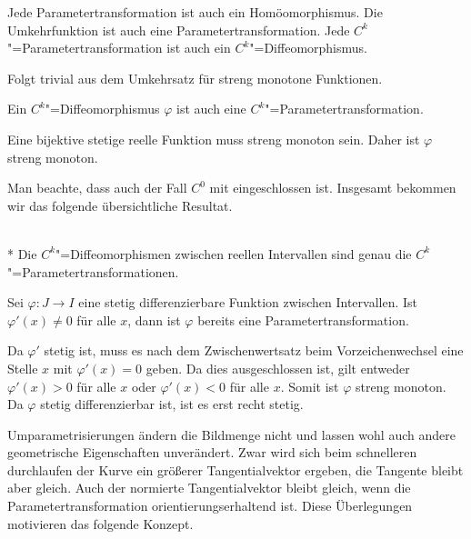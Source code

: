 \begin{corollary}
Jede Parametertransformation ist auch ein
Homöomorphismus. Die Umkehrfunktion ist auch eine
Parametertransformation. Jede $C^k$"=Parametertransformation
ist auch ein $C^k$"=Diffeomorphismus.
\end{corollary}

\noindent{}
Folgt trivial aus dem Umkehrsatz für streng monotone
Funktionen.\;\qedsymbol

\begin{corollary}
Ein $C^k$"=Diffeomorphismus $\varphi$ ist auch eine
$C^k$"=Parametertransformation.
\end{corollary}

\noindent{}
Eine bijektive stetige reelle Funktion muss streng monoton sein.
Daher ist $\varphi$ streng monoton.\;\qedsymbol

Man beachte, dass auch der Fall $C^0$ mit eingeschlossen ist.
Insgesamt bekommen wir das folgende übersichtliche Resultat.

\begin{corollary}\mbox{}\\*
Die $C^k$"=Diffeomorphismen zwischen reellen Intervallen sind
genau die $C^k$"=Parametertransformationen.
\end{corollary}

\begin{corollary}
Sei $\varphi\colon J\to I$ eine stetig differenzierbare
Funktion zwischen Intervallen. Ist $\varphi'(x)\ne 0$ für alle $x$,
dann ist $\varphi$ bereits eine Parametertransformation.
\end{corollary}

\noindent{}
Da $\varphi'$ stetig ist, muss es nach dem Zwischenwertsatz beim
Vorzeichenwechsel eine Stelle $x$ mit $\varphi'(x)=0$ geben. Da
dies ausgeschlossen ist, gilt entweder $\varphi'(x)>0$ für alle $x$
oder $\varphi'(x)<0$ für alle $x$. Somit ist $\varphi$ streng monoton.
Da $\varphi$ stetig differenzierbar ist, ist es erst recht
stetig.\;\qedsymbol

Umparametrisierungen ändern die Bildmenge nicht und lassen wohl auch
andere geometrische Eigenschaften unverändert. Zwar wird sich
beim schnelleren durchlaufen der Kurve ein größerer Tangentialvektor
ergeben, die Tangente bleibt aber gleich. Auch der normierte
Tangentialvektor bleibt gleich, wenn die Parametertransformation
orientierungserhaltend ist. Diese Überlegungen motivieren das folgende
Konzept.

